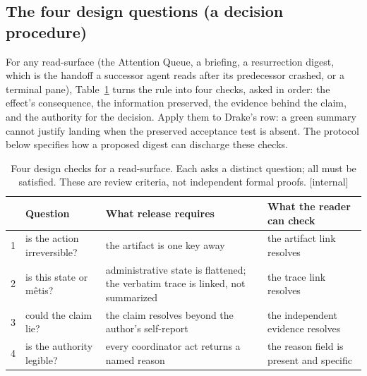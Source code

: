 \documentclass[11pt,a4paper]{article}
\theoremstyle{definition}
\theoremstyle{plain}
\newcounter{protocol}[section]
\begin{document}
\subsection{The four design questions (a decision procedure)}\label{sec:four-questions}

For any read-surface (the Attention Queue, a briefing, a resurrection digest, which is
the handoff a successor agent reads after its predecessor crashed, or a terminal pane), Table~\ref{tab:ls-four-questions} turns the rule into four checks, asked in order: the effect's
consequence, the information preserved, the evidence behind the claim, and the
authority for the decision. Apply them to Drake's row: a green summary cannot
justify landing when the preserved acceptance test is absent. The protocol
below specifies how a proposed digest can discharge these checks.


\begin{table}[H]
\centering
\caption{Four design checks for a read-surface. Each asks a distinct question; all
must be satisfied. These are review criteria, not independent formal proofs. [internal]}
\label{tab:ls-four-questions}
\small
\renewcommand{\arraystretch}{1.15}
\begin{tabularx}{\linewidth}{@{}l >{\raggedright\arraybackslash}X >{\raggedright\arraybackslash}X >{\raggedright\arraybackslash}X@{}}
\toprule
& \textbf{Question} & \textbf{What release requires} & \textbf{What the reader can check} \\
\midrule
1 & is the action irreversible? & the artifact is one key away & the artifact link resolves \\
2 & is this state or m\^etis? & administrative state is flattened; the verbatim trace is linked, not summarized & the trace link resolves \\
3 & could the claim lie? & the claim resolves beyond the author's self-report & the independent evidence resolves \\
4 & is the authority legible? & every coordinator act returns a named reason & the reason field is present and specific \\
\bottomrule
\end{tabularx}
\end{table}
\end{document}
